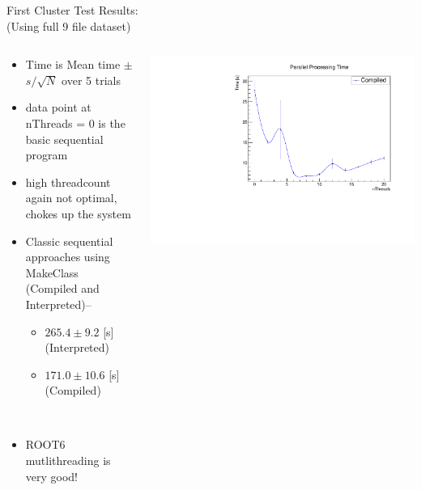 \documentclass[10pt]{beamer}
\begin{document}
\begin{frame}
First Cluster Test Results:\\
\tiny
(Using full 9 file dataset)\\
\begin{columns}
	\begin{column}{0.5\textwidth}
	\begin{itemize}
		\scriptsize
		\item Time is Mean time $\pm$ $s/\sqrt{N}$ over 5 trials
		\item data point at nThreads = 0 is the basic sequential program
		\item high threadcount again not optimal, chokes up the system
		\quad \quad \\
		\item Classic sequential approaches using MakeClass (Compiled and Interpreted)--
			\begin{itemize}
				\scriptsize
				\item $265.4 \pm  9.2$ [s] (Interpreted)
				\item $171.0 \pm  10.6$ [s] (Compiled)

			\end{itemize}
			\quad \quad \\
		\item ROOT6 mutlithreading is very good!
	\end{itemize}
	\end{column}
	\begin{column}{0.5\textwidth}
   		\includegraphics[scale=0.3, left]{../ParTree_t3/test1plott3.pdf}

	\end{column}
\end{columns}

\end{frame}
\end{document}
